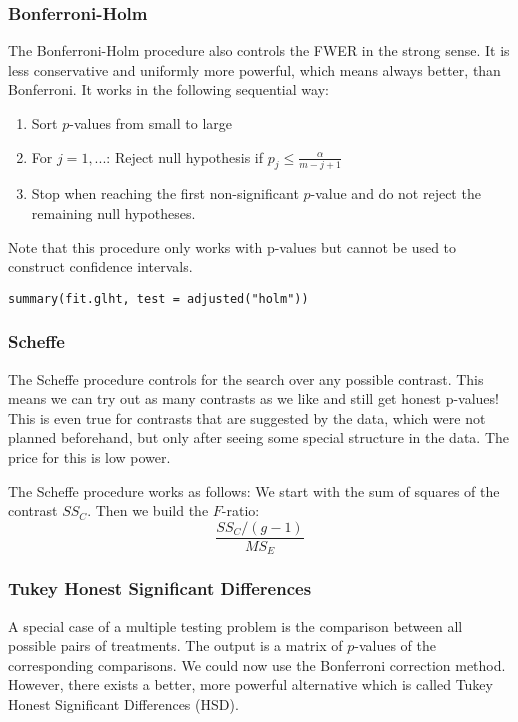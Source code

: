 \subsubsection{Bonferroni-Holm}

The Bonferroni-Holm procedure also controls the FWER in the strong sense. It is less conservative and uniformly more powerful, which means always better, than Bonferroni. It works in the following sequential way:
\begin{enumerate}
	\item Sort $p$-values from small to large
	\item For $j = 1,...$: Reject null hypothesis if $p_j \leq \frac{\alpha}{m-j+1}$
	\item Stop when reaching the first non-significant $p$-value and do not reject the remaining null hypotheses.
\end{enumerate}

Note that this procedure only works with p-values but cannot be used to construct confidence intervals.
\begin{lstlisting}
summary(fit.glht, test = adjusted("holm"))
\end{lstlisting}

\subsubsection{Scheffe}

The Scheffe procedure controls for the search over any possible contrast. This means we can try out as many contrasts as we like and still get honest p-values! This is even true for contrasts that are suggested by the data, which were not planned beforehand, but only after seeing some special structure in the data. The price for this is low power. \medskip

The Scheffe procedure works as follows: We start with the sum of squares of the contrast $SS_C$. Then we build the $F$-ratio:
$$\frac{SS_C/(g-1)}{MS_E}$$

\subsubsection{Tukey Honest Significant Differences}

A special case of a multiple testing problem is the comparison between all possible pairs of treatments. The output is a matrix of $p$-values of the corresponding comparisons. We could now use the Bonferroni correction method. However, there exists a better, more powerful alternative which is called Tukey Honest Significant Differences (HSD). \medskip

